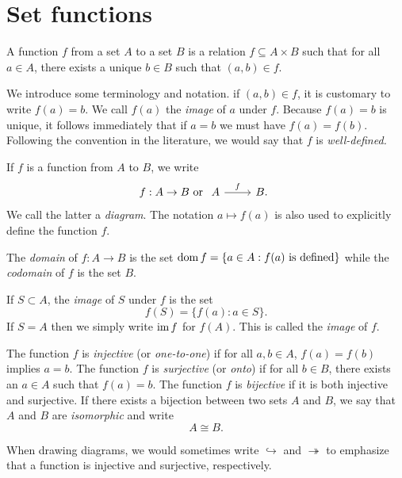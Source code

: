 \section{Set functions}

\begin{definition}
    A function \(f\) from a set \(A\) to a set \(B\) is a relation \(f \subseteq
    A \times B\) such that for all \(a \in A\), there exists a unique \(b \in
    B\) such that \((a, b) \in f\).
\end{definition}

We introduce some terminology and notation. if \((a, b) \in f\), it is
customary to write \(f(a) = b\). We call \(f(a)\) the \emph{image} of \(a\)
under \(f\). Because \(f(a) = b\) is unique, it follows immediately that if
\(a = b\) we must have \(f(a) = f(b)\). Following the convention in the
literature, we would say that \(f\) is \emph{well-defined.}

If \(f\) is a function from \(A\) to \(B\), we write
\[
    f: A \to B \text{ or } \begin{tikzcd}
        A \arrow[r, "f"] & B.
    \end{tikzcd}
\]
We call the latter a \emph{diagram}. The notation \(a \mapsto f(a)\) is also
used to explicitly define the function \(f\).

The \emph{domain} of \(f : A \to B\) is the set \(\operatorname{dom} f = \{a \in A : f(a)
\text{ is defined}\}\) while the \emph{codomain} of \(f\) is the set \(B\). 

If \(S \subset A\), the \emph{image} of \(S\) under \(f\) is the set
\[
    f(S) = \{f(a) : a \in S\}.
\]
If \(S = A\) then we simply write \(\operatorname{im} f\) for \(f(A)\). This is called
the \emph{image} of \(f\).


\begin{sectionthm}
    The function \(f\) is \emph{injective} (or \emph{one-to-one}) if for all
    \(a, b \in A\), \(f(a) = f(b)\) implies \(a = b\). The function \(f\) is
    \emph{surjective} (or \emph{onto}) if for all \(b \in B\), there exists an
    \(a \in A\) such that \(f(a) = b\). The function \(f\) is \emph{bijective}
    if it is both injective and surjective. If there exists a bijection between
    two sets \(A\) and \(B\), we say that \(A\) and \(B\) are \emph{isomorphic}
    and write
    \[
        A \cong B.
    \]

    When drawing diagrams, we would sometimes write \(\hookrightarrow\) and
    \(\twoheadrightarrow\) to emphasize that a function is injective and
    surjective, respectively.
\end{sectionthm}

